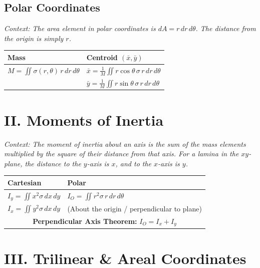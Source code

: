 \documentclass[11pt, a4paper]{article}
\begin{document}
\subsection*{\color{secondary} Polar Coordinates}
\textit{\small Context: The area element in polar coordinates is $dA = r \, dr \, d\theta$. The distance from the origin is simply $r$.}
\begin{center}
\begin{tabular}{@{}p{} p{}@{}}
\toprule
\textbf{Mass} & \textbf{Centroid $(\bar{x}, \bar{y})$} \\
\midrule
$M = \iint \sigma(r,\theta) \, r \, dr \, d\theta$ & $\bar{x} = \frac{1}{M} \iint r \cos\theta \, \sigma \, r \, dr \, d\theta$ \\
& $\bar{y} = \frac{1}{M} \iint r \sin\theta \, \sigma \, r \, dr \, d\theta$ \\
\bottomrule
\end{tabular}
\end{center}


\section*{\color{primary} II. Moments of Inertia}

\textit{\small Context: The moment of inertia about an axis is the sum of the mass elements multiplied by the square of their distance from that axis. For a lamina in the $xy$-plane, the distance to the $y$-axis is $x$, and to the $x$-axis is $y$.}

\begin{center}
\begin{tabular}{@{}p{} p{}@{}}
\toprule
\textbf{Cartesian} & \textbf{Polar} \\
\midrule
$I_y = \iint x^2 \sigma \, dx \, dy$ & $I_O = \iint r^2 \sigma \, r \, dr \, d\theta$ \\
$I_x = \iint y^2 \sigma \, dx \, dy$ & (About the origin / perpendicular to plane) \\
\midrule
\multicolumn{2}{c}{\textbf{\color{accent}Perpendicular Axis Theorem:} $I_O = I_x + I_y$} \\
\bottomrule
\end{tabular}
\end{center}

\vspace{0.3cm}

\section*{\color{primary} III. Trilinear \& Areal Coordinates}
\end{document}
